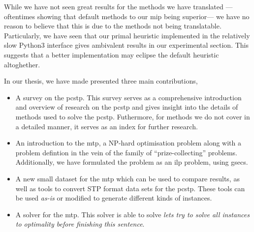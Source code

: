 While we have not seen great results for the methods we have translated
---oftentimes showing that default methods to our \gls{mip} being superior---
we have no reason to believe that this is due to the methods not being
translatable. Particularly, we have seen that our primal heuristic implemented
in the relatively slow Python3 interface gives ambivalent results in our experimental
section. This suggests that a better implementation may eclipse the default heuristic
altoghether.

In our thesis, we have made presented three main contributions,
\begin{itemize}
\item A survey on the \gls{pcstp}. This survey serves as a comprehensive introduction
  and overview of research on the \gls{pcstp} and gives insight into the details of
  methods used to solve the \gls{pcstp}. Futhermore, for methods we do not cover
  in a detailed manner, it serves as an index for further research.
\item An introduction to the \acrlong{mtp}, a NP-hard optimisation problem along with
  a problem defintion in the vein of the family of ``prize-collecting'' problems.
  Additionally, we have formulated the problem as an \gls{ilp} problem, using \glspl{gsec}.
\item A new small dataset for the \gls{mtp} which can be used to compare results, as well
  as tools to convert STP format data sets for the \gls{pcstp}. These tools can be used
  \textit{as-is} or modified to generate different kinds of instances.
\item A solver for the \gls{mtp}. This solver is able to solve \textit{lets try to solve all
  instances to optimality before finishing this sentence}.
\end{itemize}




